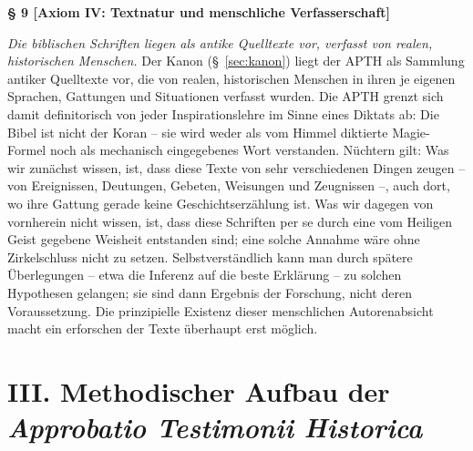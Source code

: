 \documentclass[11pt,a4paper]{article}
\makeatletter
\newcommand{\apth}{{\apthfont APTH}\hspace{0.15em}\xspace}
\newcommand{\apthsec}[3]{%
  \phantomsection%
  \def\@currentlabel{#1}%
  \label{sec:#3}%
  \textbf{§ #1 [#2]}%
}
\makeatother
\begin{document}
\apthsec{9}{Axiom IV: Textnatur und menschliche Verfasserschaft}{textnatur}
\textit{Die biblischen Schriften liegen als antike Quelltexte vor, verfasst von realen, historischen Menschen.}
Der Kanon (§~\ref{sec:kanon}) liegt der \apth als Sammlung antiker Quelltexte vor, die von realen, historischen Menschen in ihren je eigenen Sprachen, Gattungen und Situationen verfasst wurden. Die \apth grenzt sich damit definitorisch von jeder Inspirationslehre im Sinne eines Diktats ab: Die Bibel ist nicht der Koran – sie wird weder als vom Himmel diktierte Magie-Formel noch als mechanisch eingegebenes Wort verstanden. Nüchtern gilt: Was wir zunächst wissen, ist, dass diese Texte von sehr verschiedenen Dingen zeugen – von Ereignissen, Deutungen, Gebeten, Weisungen und Zeugnissen –, auch dort, wo ihre Gattung gerade keine Geschichtserzählung ist. Was wir dagegen von vornherein nicht wissen, ist, dass diese Schriften per se durch eine vom Heiligen Geist gegebene Weisheit entstanden sind; eine solche Annahme wäre ohne Zirkelschluss nicht zu setzen. Selbstverständlich kann man durch spätere Überlegungen – etwa die Inferenz auf die beste Erklärung – zu solchen Hypothesen gelangen; sie sind dann Ergebnis der Forschung, nicht deren Voraussetzung. Die prinzipielle Existenz dieser menschlichen Autorenabsicht macht ein erforschen der Texte überhaupt erst möglich.

\section*{III. Methodischer Aufbau der \textit{Approbatio Testimonii Historica}}
\end{document}
